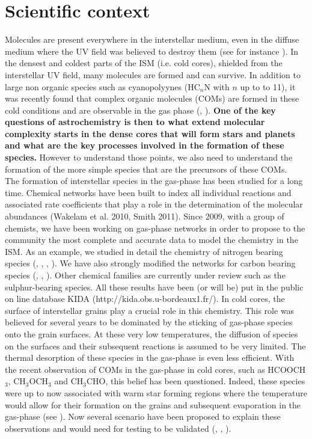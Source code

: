 \section{Scientific context} 


Molecules are present everywhere in the interstellar medium, even in the diffuse medium where the UV field was believed to destroy them (see for instance \cite{2012ApJ...753L..28L}). In the densest and coldest parts of the ISM (i.e. cold cores), shielded from the interstellar UV field, many molecules are formed and can survive. In addition to large non organic species such as cyanopolyynes (HC$_n$N with $n$ up to to 11), it was recently found that complex organic molecules (COMs) are formed in these cold conditions and are observable in the gas phase (\cite{Bacmann_2012}, \cite{2014ApJ...795L...2V}). \textbf{One of the key questions of astrochemistry is then to what extend molecular complexity starts in the dense cores that will form stars and planets and what are the key processes involved in the formation of these species.} However to understand those points, we also need to understand the formation of the more simple species that are the precursors of these COMs. \\
The formation of interstellar species in the gas-phase has been studied for a long time. Chemical networks have been built to index all individual reactions and associated rate coefficients that play a role in the determination of the molecular abundances (Wakelam et al. 2010, Smith 2011). Since 2009, with a group of chemists, we have been working on gas-phase networks in order to propose to the community the most complete and accurate data to model the chemistry in the ISM. As an example, we studied in detail the chemistry of nitrogen bearing species (\cite{2013PCCP...1513888D}, \cite{2012PNAS..10910233D}, \cite{2014MNRAS.443..398L}, \cite{2013arXiv1310.4350W}). We have also strongly modified the networks for carbon bearing species (\cite{Wakelam_2009}, \cite{2014MNRAS.437..930L}, \cite{2015MNRAS.453L..48W}). Other chemical families are currently under review such as the sulphur-bearing species. All these results have been (or will be) put in the public on line database KIDA (http://kida.obs.u-bordeaux1.fr/).
In cold cores, the surface of interstellar grains play a crucial role in this chemistry. This role was believed for several years to be dominated by the sticking of gas-phase species onto the grain surfaces. At these very low temperatures, the diffusion of species on the surfaces and their subsequent reactions is assumed to be very limited. The thermal desorption of these species in the gas-phase is even less efficient. With the recent observation of COMs in the gas-phase in cold cores, such as HCOOCH$_3$, CH$_3$OCH$_3$ and CH$_3$CHO, this belief has been questioned. Indeed, these species were up to now associated with warm star forming regions where the temperature would allow for their formation on the grains and subsequent evaporation in the gas-phase (see \cite{Herbst_2009}). Now several scenario have been proposed to explain these observations and would need for testing to be validated (\cite{2013ApJ...769...34V}, \cite{2015MNRAS.449L..16B}, \cite{2015MNRAS.447.4004R}).



